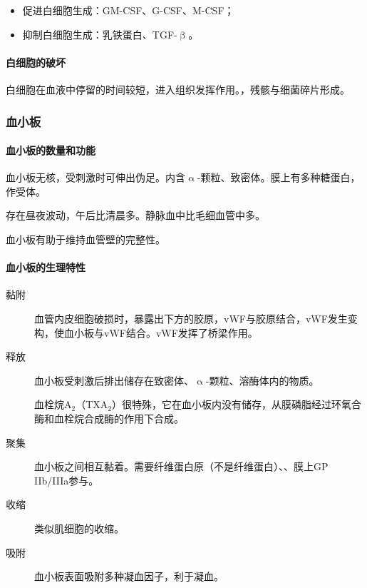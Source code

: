\begin{itemize}
	\item 促进白细胞生成：GM-CSF、G-CSF、M-CSF；
	\item 抑制白细胞生成：乳铁蛋白、TGF-$\upbeta$。
\end{itemize}

\paragraph{白细胞的破坏}

白细胞在血液中停留的时间较短，进入组织发挥作用。，残骸与细菌碎片形成。

\subsubsection{血小板}

\paragraph{血小板的数量和功能}

血小板无核，受刺激时可伸出伪足。内含$\upalpha$-颗粒、致密体。膜上有多种糖蛋白，作受体。

存在昼夜波动，午后比清晨多。静脉血中比毛细血管中多。

血小板有助于维持血管壁的完整性。

\paragraph{血小板的生理特性}

\begin{description}
	\item[黏附] 血管内皮细胞破损时，暴露出下方的胶原，vWF与胶原结合，vWF发生变构，使血小板与vWF结合。vWF发挥了桥梁作用。
	\item[释放] 血小板受刺激后排出储存在致密体、$\upalpha$-颗粒、溶酶体内的物质。

	血栓烷A$_{2}$（TXA$_{2}$）很特殊，它在血小板内没有储存，从膜磷脂经过环氧合酶和血栓烷合成酶的作用下合成。
	\item[聚集] 血小板之间相互黏着。需要纤维蛋白原（不是纤维蛋白）、、膜上GP IIb/IIIa参与。
	\item[收缩] 类似肌细胞的收缩。
	\item[吸附] 血小板表面吸附多种凝血因子，利于凝血。
\end{description}

